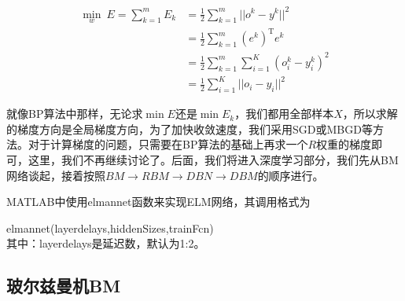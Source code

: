 {        \begin{align*}
        \min_w \ E = \sum_{k=1}^m E_k & = \frac{1}{2} \sum_{k=1}^m||o^k-y^k||^2\\
        & = \frac{1}{2} \sum_{k=1}^m (e^k)^\mathrm{T}e^k\\
        & =\frac{1}{2} \sum_{k=1}^m \sum_{i=1}^K (o_i^k - y_i^k)^2\\
        & =\frac{1}{2} \sum_{i=1}^K||o_i-y_i||^2
        \end{align*}
        \par
        就像BP算法中那样，无论求$\min E$还是$\min E_k$，我们都用全部样本$X$，所以求解的梯度方向是全局梯度方向，为了加快收敛速度，我们采用SGD或MBGD等方法。对于计算梯度的问题，只需要在BP算法的基础上再求一个$R$权重的梯度即可，这里，我们不再继续讨论了。后面，我们将进入深度学习部分，我们先从BM网络谈起，接着按照$BM\to RBM\to DBN\to DBM$的顺序进行。
        \par
        MATLAB中使用elmannet函数来实现ELM网络，其调用格式为
        \par
        elmannet(layerdelays,hiddenSizes,trainFcn)\\
        其中：layerdelays是延迟数，默认为1:2。

    \subsection{玻尔兹曼机BM}
}
